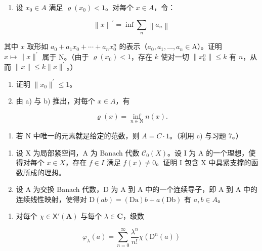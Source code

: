 \begin{enumerate}
\def\labelenumi{\alph{enumi})}
\tightlist
\item
  设 \(x_{0} \in A\) 满足 \(\varrho(x_{0}) < 1\)。对每个 \(x \in A\)，令：
\end{enumerate}

\[
\left\| x \right\| ^ {\prime} = \inf \sum_ {n} \left\| a _ {n} \right\|
\]

其中 \(x\) 取形如 \(a_0 + a_1 x_0 + \cdots + a_n x_0^n\) 的表示（\(a_0, a_1, \ldots, a_n \in \mathrm{A}\)）。证明 \(x \mapsto \|x\|^{\prime}\) 属于 N。（由于 \(\varrho(x_0) < 1\)，存在 \(k\) 使对一切 \(\|x_0^n\| \leqslant k\) 有 \(n\)，从而 \(\|x\| \leqslant k \|x\|^{\prime}\)。）

\begin{enumerate}
\def\labelenumi{\alph{enumi})}
\setcounter{enumi}{1}
\item
  证明 \(\|x_{0}\|^{\prime}\leqslant1\)。
\item
  由 a) 与 b) 推出，对每个 \(x \in A\)，有
\end{enumerate}

\[
\varrho (x) = \inf _ {n \in \mathrm{N}} n (x).
\]

\begin{enumerate}
\def\labelenumi{\alph{enumi})}
\setcounter{enumi}{3}
\tightlist
\item
  若 N 中唯一的元素就是给定的范数，则 \(A = C \cdot 1\)。（利用 c) 与习题 7。）
\end{enumerate}

\begin{enumerate}
\def\labelenumi{\arabic{enumi})}
\setcounter{enumi}{8}
\item
  设 X 为局部紧空间，A 为 Banach 代数 \(\mathcal{C}_{0}(X)\)。设 I 为 A 的一个理想，使得对每个 \(x \in X\)，存在 \(f \in I\) 满足 \(f(x) \neq 0\)。证明 I 包含 X 中具紧支撑的函数所成的理想。
\item
  设 A 为交换 Banach 代数，D 为 A 到 A 中的一个连续导子，即 A 到 A 中的连续线性映射，使得对 \(\mathrm{D}(ab)=(\mathrm{Da})b+a(\mathrm{Db})\) 有 \(a,b\in A\)。
\end{enumerate}

\begin{enumerate}
\def\labelenumi{\alph{enumi})}
\tightlist
\item
  对每个 \(\chi \in \mathsf{X}'(\mathbf{A})\) 与每个 \(\lambda \in \mathbf{C}\)，级数
\end{enumerate}

\[
\varphi_ {\lambda} (a) = \sum_ {n = 0} ^ {\infty} \frac {\lambda^ {n}}{n !} \chi (\mathrm{D} ^ {n} (a))
\]

